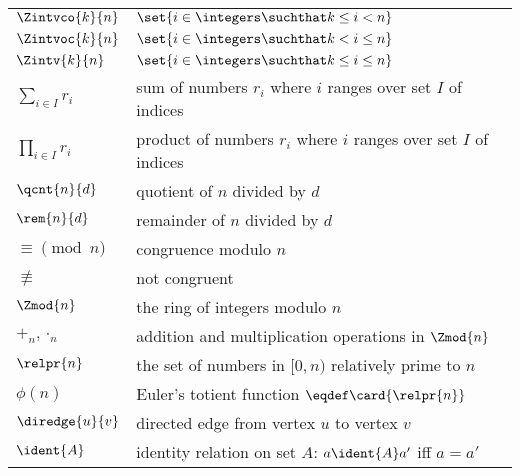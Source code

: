\begin{center}
\begin{tabular}{ll}
$\Zintvco{k}{n}$       & $\set{i \in \integers \suchthat k \le i < n}$\\
$\Zintvoc{k}{n}$       & $\set{i \in \integers \suchthat k < i \le n}$\\
$\Zintv{k}{n}$        & $\set{i \in \integers \suchthat k \le i \le n}$\\
$\sum_{i \in I} r_i$ & sum of numbers $r_i$ where $i$ ranges over
set $I$ of indices\\
$\prod_{i \in I} r_i$ & product of numbers $r_i$ where $i$ ranges over
set $I$ of indices\\
$\qcnt{n}{d}$  & quotient of $n$ divided by $d$\\
$\rem{n}{d}$   & remainder of $n$ divided by $d$\\
$\equiv \pmod{n}$ & congruence modulo $n$\\
$\not\equiv$   & not congruent\\
$\Zmod{n}$     & the ring of integers modulo $n$\\
$+_n, \cdot_n$ & addition and multiplication operations in $\Zmod{n}$\\
$\relpr{n}$    & the set of numbers in $[0,n)$ relatively prime to $n$\\
$\phi(n)$      & Euler's totient function $\eqdef \card{\relpr{n}}$\\
$\diredge{u}{v}$ & directed edge from vertex $u$ to vertex $v$\\
$\ident{A}$    & identity relation on set $A$: $a \ident{A} a'$ iff $a = a'$
\end{tabular}
\end{center}


